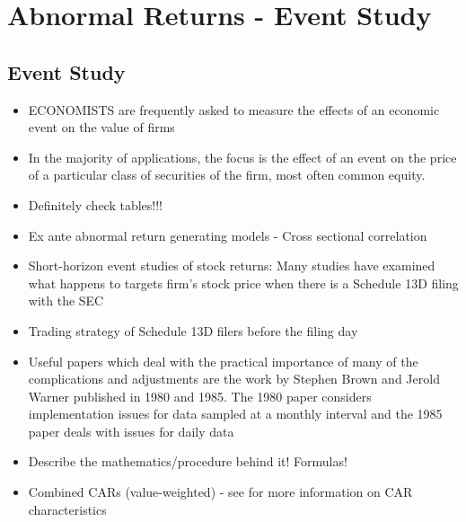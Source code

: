 \documentclass[12pt]{article}
\begin{document}
\section{Abnormal Returns - Event Study} 

\subsection{Event Study}
   
    \begin{itemize}
        
        \item ECONOMISTS are frequently asked to measure the effects of an economic event on the value of firms \citep{MacKinlay1997}

        \item In the majority of applications, the focus is the effect of an event on the price of a particular class of securities of the firm, most often common equity. \citep{MacKinlay1997}

        \item Definitely check \citet{Betton2009} tables!!!
        
        \item Ex ante abnormal return generating models \citep{Kolari2010} - Cross sectional correlation 

        \item Short-horizon event studies of stock returns: Many studies have examined what happens to targets firm’s stock price when there is a Schedule 13D filing with the SEC \citep{CoffeeJr.2014}

        \item Trading strategy of Schedule 13D filers before the filing day \citep{Collin-Dufresne2015}
        
        \item Useful papers which deal with the practical importance of many of the complications and adjustments are the work by Stephen Brown and Jerold Warner published in 1980 and 1985. The 1980 paper considers implementation issues for data sampled at a monthly interval and the 1985 paper deals with issues for daily data \citep{MacKinlay1997}
        
        \item Describe the mathematics/procedure behind it! Formulas! 

        \item Combined CARs (value-weighted) - see \citet{Mitchell2011} for more information on CAR characteristics


\end{itemize}
\end{document}
